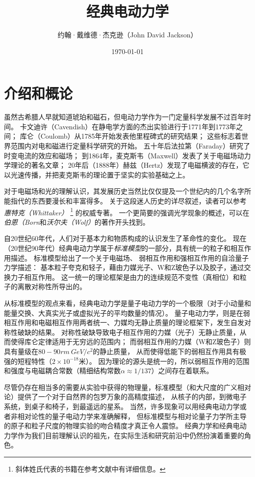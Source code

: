 \documentclass[12pt]{book}
\title{经典电动力学}
\author{约翰·戴维德·杰克逊（John David Jackson）}
\date{\today}
\numberwithin{equation}{chapter}
\numberwithin{figure}{chapter}
\numberwithin{footnote}{page}
\begin{document}
\maketitle

\chapter{介绍和概论}\label{cha:I}

虽然古希腊人早就知道琥珀和磁石，但电动力学作为一门定量科学发展不过百年时间。
卡文迪许（Cavendish）在静电学方面的杰出实验进行于1771年到1773年之间；
库仑（Coulomb）从1785年开始发表他里程碑式的研究结果；
这些标志着世界范围内对电和磁进行定量科学研究的开始。
五十年后法拉第（Faraday）研究了时变电流的效应和磁场；
到1864年，麦克斯韦（Maxwell）发表了关于电磁场动力学理论的著名文章；
20年后（1888年）赫兹（Hertz）发现了电磁横波的存在，它以光速传播，并把麦克斯韦的理论置于坚实的实验基础之上。

对于电磁场和光的理解认识，其发展历史当然比仅仅提及一个世纪内的几个名字所能指代的东西要漫长和丰富得多。
关于这段迷人历史的详尽叙述，读者可以参考\textit{惠特克（Whittaker）}
\footnote{斜体姓氏代表的书籍在参考文献中有详细信息。}
的权威专著。
一个更简要的强调光学现象的概述，可以在\textit{伯恩（Born}和\textit{沃尔夫（Wolf）}的著作开头找到。

自20世纪60年代，人们对于基本力和物质构成的认识发生了革命性的变化。
现在（20世纪90年代）经典电动力学属于\textit{标准模型}的一部分，具有统一的粒子和相互作用描述。
标准模型给出了一个关于电磁场、 弱相互作用和强相互作用的自洽量子力学描述：
基本粒子夸克和轻子，藉由力媒光子、W和Z玻色子以及胶子，通过交换力子相互作用。
这一统一的理论框架是由力的连续规范不变性（真相位）和粒子的离散对称性所导出的。

从标准模型的观点来看，经典电动力学是量子电动力学的一个极限（对于小动量和能量交换、大真实光子或虚拟光子的平均数量的情况）。
量子电动力学，则是在弱相互作用和电磁相互作用两者统一、力媒均无静止质量的理论框架下，发生自发对称性破缺的结果。
对称性破缺导致电子相互作用的力媒（光子）无静止质量，从而使得库仑定律适用于无穷远的范围内；
而弱相互作用的力媒（W和Z玻色子）则具有量级在$80-90{rm\ GeV/c^2}$的静止质量，
从而使得低能下的弱相互作用具有极强的短程特性（$2\times 10^{-18}$米）。
因为理论的源头是统一的，所以弱相互作用的范围和强度与电磁耦合常数（精细结构常数$\alpha\approx 1/137$）之间存在着联系。

尽管仍存在相当多的需要从实验中获得的物理量，标准模型（和大尺度的广义相对论）提供了一个对于自然界的包罗万象的高精度描述，
从核子的内部，到微电子系统，到桌子和椅子，到最遥远的星系。
当然，许多现象可以用经典电动力学或者非相对论性的量子电动力学来准确解释，
但标准模型与相对论量子力学所主导的原子和粒子尺度的物理实验的吻合精度才真正令人震惊。
经典力学和经典电动力学作为我们目前理解认识的祖先，在实际生活和研究前沿中仍然扮演着重要的角色。
\end{document}
